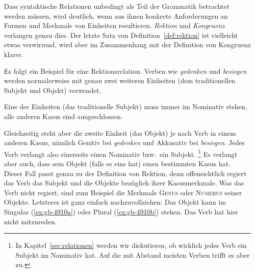 Dass syntaktische Relationen unbedingt als Teil der Grammatik betrachtet werden müssen, wird deutlich, wenn aus ihnen konkrete Anforderungen an Formen und Merkmale von Einheiten resultieren.
\textit{Rektion} und \textit{Kongruenz} verlangen genau dies.
Der letzte Satz von Definition~\ref{def:rektion} ist vielleicht etwas verwirrend, wird aber im Zusammenhang mit der Definition von Kongruenz klarer.


Es folgt ein Beispiel für eine Rektionsrelation.
Verben wie \textit{gedenken} und \textit{besiegen} werden normalerweise mit genau zwei weiteren Einheiten (dem traditionellen Subjekt und Objekt) verwendet.

\begin{exe}
\end{exe}

Eine der Einheiten (das traditionelle Subjekt) muss immer im Nominativ stehen, alle anderen Kasus sind ausgeschlossen.

\begin{exe}
  \ex
  \begin{xlist}
  \end{xlist}
\end{exe}

Gleichzeitig steht aber die zweite Einheit (das Objekt) je nach Verb in einem anderen Kasus, nämlich Genitiv bei \textit{gedenken} und Akkusativ bei \textit{besiegen}.
Jedes Verb verlangt also einerseits einen Nominativ bzw.\ ein Subjekt.%
\footnote{In Kapitel~\ref{sec:relationen} werden wir diskutieren, ob wirklich jedes Verb ein Subjekt im Nominativ hat.
Auf die mit Abstand meisten Verben trifft es aber zu.}
Es verlangt aber auch, dass sein Objekt (falls es eins hat) einen bestimmten Kasus hat.
Dieser Fall passt genau zu der Definition von Rektion, denn offensichtlich regiert das Verb das Subjekt und die Objekte bezüglich ihrer Kasusmerkmale.
Was das Verb nicht regiert, sind zum Beispiel die Merkmale \textsc{Genus} oder \textsc{Numerus} seiner Objekte.
Letzteres ist ganz einfach nachzuvollziehen:
Das Objekt kann im Singular (\ref{ex:gb-4910a}) oder Plural (\ref{ex:gb-4910b}) stehen.
Das Verb hat hier nicht mitzureden.

